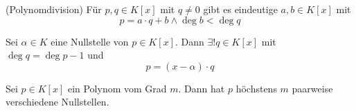 \documentclass[../Algebra_script.tex]{subfiles}
\begin{document}
\begin{theorem}{(Polynomdivision)}
	Für $p, q \in K[x]$ mit $q \neq 0$ gibt es eindeutige $a, b \in K[x]$ mit 
	\[p = a\cdot q + b \wedge \deg{b} < \deg{q}\]
\end{theorem}

\begin{corollary}
	Sei $\alpha \in K$ eine Nullstelle von $p \in K[x]$. Dann $\exists!q \in K[x]$ mit $\deg{q} = \deg{p} - 1$ und 
	\[p = (x - \alpha) \cdot q\]
\end{corollary}

\begin{corollary}
	Sei $p \in K[x]$ ein Polynom vom Grad $m$. Dann hat $p$ höchstens $m$ paarweise verschiedene Nullstellen.
\end{corollary}
\end{document}
